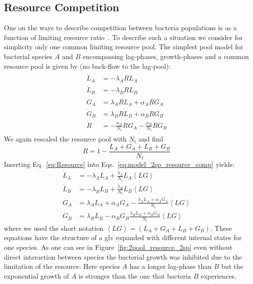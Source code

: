 \documentclass[10pt,A4paper]{article}
\numberwithin{equation}{section}
\begin{document}
\subsection{Resource Competition}
One on the ways to describe competition between bacteria populations is as a function of limiting resource ratio~\cite{tilman_resource_1977, smith_effects_2002}.
To describe such a situation we consider for simplicity only one common limiting resource pool.
The simplest pool model for bacterial species $A$ and $B$ encompassing lag-phases, growth-phases and a common resource pool is given by (no back-flow to the lag-pool):
\begin{align}
    \begin{split}
        \dot{L}_A &= - \lambda_A R L_A\\
        \dot{L}_B &= - \lambda_B R L_B \\
        \dot{G}_A &= \lambda_A R L_A +\alpha_A R G_A\\
        \dot{G}_B &= \lambda_B R L_B +\alpha_B R G_B\\
        \dot{R} &=-\frac{\alpha_A}{N_t} R G_A-\frac{\alpha_B}{N_t} R G_B
    \end{split}
    \label{eq:model_2sp_resource_comp}
\end{align}
We again rescaled the resource pool with $N_t$ and find
\begin{equation}
    R =1-\frac{L_A+G_A+L_B+G_B}{N_t}
    \label{eq:Resource}
\end{equation}
Inserting Eq.~\ref{eq:Resource} into Eqs.~\ref{eq:model_2sp_resource_comp} yields:
\begin{align}
    \dot{L}_A &= -\lambda_A  L_A + \frac{\lambda_A}{N_t}L_A\left<LG\right>\\
    \dot{L}_B &= -\lambda_B L_B + \frac{\lambda_B}{N_t}L_B \left<LG\right>\\
    \dot{G}_A &=  \lambda_A  L_A + \alpha_A G_A - \frac{\lambda_A L_A + \alpha_A G_A}{N_t} \left<LG\right>\\
    \dot{G}_B &=  \lambda_B L_B - \alpha_B G_B \frac{\lambda_B L_B + \alpha_B G_B}{N_t}\left<LG\right>
\end{align}
where we used the short notation $\left<LG\right>=(L_A+G_A+L_B+G_B)$.
These equations have the structure of a \ac{glv} expanded with different internal states for one species.
As one can see in Figure~\ref{fig:2pool_resource_2sp} even without direct interaction between species the bacterial growth was inhibited due to the limitation of the resource.
Here species $A$ has a longer lag-phase than $B$ but the exponential growth of $A$ is stronger than the one that bacteria $B$ experiences.
\end{document}
